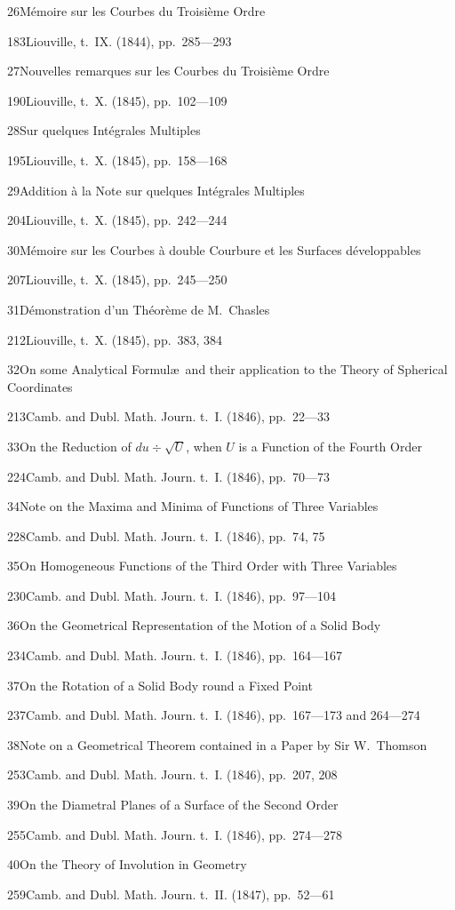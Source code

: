 \documentclass[11pt,a4paper]{book}
\providecommand{\tocentry}[2]{#1\dotfill #2\par}
\begin{document}
\tocentry{26}{M\'{e}moire sur les Courbes du Troisi\`{e}me Ordre}{183}{Liouville, t.~IX. (1844), pp.~285---293}

\tocentry{27}{Nouvelles remarques sur les Courbes du Troisi\`{e}me Ordre}{190}{Liouville, t.~X. (1845), pp.~102---109}

\tocentry{28}{Sur quelques Int\'{e}grales Multiples}{195}{Liouville, t.~X. (1845), pp.~158---168}

\tocentry{29}{Addition \`{a} la Note sur quelques Int\'{e}grales Multiples}{204}{Liouville, t.~X. (1845), pp.~242---244}

\tocentry{30}{M\'{e}moire sur les Courbes \`{a} double Courbure et les Surfaces d\'{e}veloppables}{207}{Liouville, t.~X. (1845), pp.~245---250}

\tocentry{31}{D\'{e}monstration d'un Th\'{e}or\`{e}me de M.~Chasles}{212}{Liouville, t.~X. (1845), pp.~383, 384}

\newpage

\tocentry{32}{On some Analytical Formul\ae\ and their application to the Theory of Spherical Coordinates}{213}{Camb. and Dubl. Math. Journ. t.~I. (1846), pp.~22---33}

\tocentry{33}{On the Reduction of $du \div \sqrt{U}$, when $U$ is a Function of the Fourth Order}{224}{Camb. and Dubl. Math. Journ. t.~I. (1846), pp.~70---73}

\tocentry{34}{Note on the Maxima and Minima of Functions of Three Variables}{228}{Camb. and Dubl. Math. Journ. t.~I. (1846), pp.~74, 75}

\tocentry{35}{On Homogeneous Functions of the Third Order with Three Variables}{230}{Camb. and Dubl. Math. Journ. t.~I. (1846), pp.~97---104}

\tocentry{36}{On the Geometrical Representation of the Motion of a Solid Body}{234}{Camb. and Dubl. Math. Journ. t.~I. (1846), pp.~164---167}

\tocentry{37}{On the Rotation of a Solid Body round a Fixed Point}{237}{Camb. and Dubl. Math. Journ. t.~I. (1846), pp.~167---173 and 264---274}

\tocentry{38}{Note on a Geometrical Theorem contained in a Paper by Sir W.~Thomson}{253}{Camb. and Dubl. Math. Journ. t.~I. (1846), pp.~207, 208}

\tocentry{39}{On the Diametral Planes of a Surface of the Second Order}{255}{Camb. and Dubl. Math. Journ. t.~I. (1846), pp.~274---278}

\tocentry{40}{On the Theory of Involution in Geometry}{259}{Camb. and Dubl. Math. Journ. t.~II. (1847), pp.~52---61}
\end{document}
